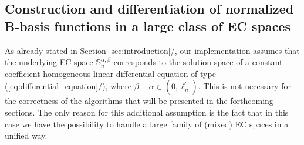 \documentclass[b5paper, twosided]{book}
\DeclareRobustCommand{\mref}[1]{\ref{#1}{\relsize{-1}/\pageref{#1}}}
\begin{document}
\subsection{Construction and differentiation of normalized B-basis functions in a large class of EC spaces}\label{subsec:construction}

As already stated in Section \mref{sec:introduction}, our implementation assumes that the underlying EC space $\mathbb{S}_{n}^{\alpha,\beta}$ corresponds to the solution space of a constant-coefficient homogeneous linear differential equation of type (\mref{eq:differential_equation}), where $\beta-\alpha \in \left(0,\ell_n^{\prime}\right)$. This is not necessary for the correctness of the algorithms that will be presented in the forthcoming sections. The only reason for this additional assumption is the fact that in this case we have the possibility to handle a large family of (mixed) EC spaces in a unified way.
\end{document}

